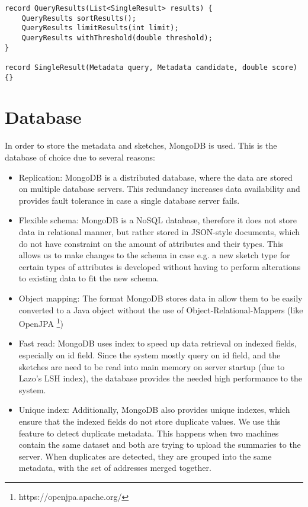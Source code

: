 \begin{lstlisting}[caption={QueryResults class and the various methods to sort, filter, and limit matches}, label=lst:queryResults]
record QueryResults(List<SingleResult> results) {
    QueryResults sortResults();
    QueryResults limitResults(int limit);
    QueryResults withThreshold(double threshold);
}

record SingleResult(Metadata query, Metadata candidate, double score) {}
\end{lstlisting}

\section{Database}

In order to store the metadata and sketches, MongoDB is used. This is the database of choice due to several reasons:

\begin{itemize}
    \item Replication: MongoDB is a distributed database, where the data are stored on multiple database servers. This redundancy increases data availability and provides fault tolerance in case a single database server fails.
    \item Flexible schema: MongoDB is a NoSQL database, therefore it does not store data in relational manner, but rather stored in JSON-style documents, which do not have constraint on the amount of attributes and their types. This allows us to make changes to the schema in case e.g. a new sketch type for certain types of attributes is developed without having to perform alterations to existing data to fit the new schema.
    \item Object mapping: The format MongoDB stores data in allow them to be easily converted to a Java object without the use of Object-Relational-Mappers (like OpenJPA \footnote{https://openjpa.apache.org/})
    \item Fast read: MongoDB uses index to speed up data retrieval on indexed fields, especially on id field. Since the system mostly query on id field, and the sketches are need to be read into main memory on server startup (due to Lazo's LSH index), the database provides the needed high performance to the system.
    \item Unique index: Additionally, MongoDB also provides unique indexes, which ensure that the indexed fields do not store duplicate values. We use this feature to detect duplicate metadata. This happens when two machines contain the same dataset and both are trying to upload the summaries to the server. When duplicates are detected, they are grouped into the same metadata, with the set of addresses merged together.
\end{itemize}

